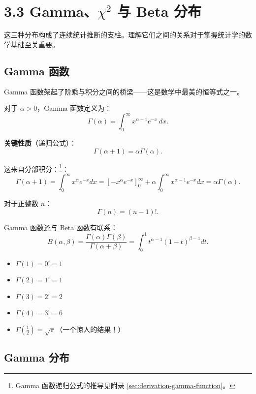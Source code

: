 \section{3.3 Gamma、$\chi^{2}$ 与 Beta 分布}\label{sec:gamma-family-ch3}

这三种分布构成了连续统计推断的支柱。理解它们之间的关系对于掌握统计学的数学基础至关重要。

\subsection{Gamma 函数}\label{sub:gamma-function-ch3}

Gamma 函数架起了阶乘与积分之间的桥梁——这是数学中最美的恒等式之一。

\begin{definition}[Gamma 函数]\label{def:gamma-function-ch3}
对于 $\alpha > 0$，Gamma 函数定义为：
\[
\Gamma(\alpha) = \int_{0}^{\infty} x^{\alpha-1} e^{-x} \, dx.
\label{eq:gamma-function-def-ch3}
\]
\end{definition}

\textbf{关键性质}（递归公式）：
\[
\Gamma(\alpha+1) = \alpha\Gamma(\alpha).
\label{eq:gamma-recursion-ch3}
\]

这来自分部积分：\footnote{Gamma 函数递归公式的推导见附录 \cref{sec:derivation-gamma-function}。}：
\[
\Gamma(\alpha+1) = \int_{0}^{\infty} x^{\alpha} e^{-x} dx = \left[-x^{\alpha} e^{-x}\right]_{0}^{\infty} + \alpha \int_{0}^{\infty} x^{\alpha-1} e^{-x} dx = \alpha\Gamma(\alpha).
\]

对于正整数 $n$：
\[
\Gamma(n) = (n-1)!.
\]

Gamma 函数还与 Beta 函数有联系：
\[
B(\alpha, \beta) = \frac{\Gamma(\alpha)\Gamma(\beta)}{\Gamma(\alpha+\beta)} = \int_{0}^{1} t^{\alpha-1}(1-t)^{\beta-1} dt.
\label{eq:beta-function-ch3}
\]

\begin{example}\label{ex:gamma-values-ch3}
\begin{itemize}
\item $\Gamma(1) = 0! = 1$
\item $\Gamma(2) = 1! = 1$
\item $\Gamma(3) = 2! = 2$
\item $\Gamma(4) = 3! = 6$
\item $\Gamma(\frac{1}{2}) = \sqrt{\pi}$（一个惊人的结果！）
\end{itemize}
\end{example}

\subsection{Gamma 分布}\label{sub:gamma-distribution-ch3}

